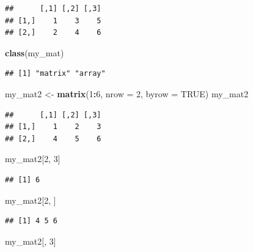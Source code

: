 \documentclass[
]{book}
\newenvironment{Shaded}{\begin{snugshade}}{\end{snugshade}}
\newcommand{\AttributeTok}[1]{\textcolor[rgb]{0.13,0.29,0.53}{#1}}
\newcommand{\ConstantTok}[1]{\textcolor[rgb]{0.56,0.35,0.01}{#1}}
\newcommand{\DecValTok}[1]{\textcolor[rgb]{0.00,0.00,0.81}{#1}}
\newcommand{\FunctionTok}[1]{\textcolor[rgb]{0.13,0.29,0.53}{\textbf{#1}}}
\newcommand{\NormalTok}[1]{#1}
\newcommand{\OtherTok}[1]{\textcolor[rgb]{0.56,0.35,0.01}{#1}}
\newcommand{\SpecialCharTok}[1]{\textcolor[rgb]{0.81,0.36,0.00}{\textbf{#1}}}
\theoremstyle{definition}
\theoremstyle{definition}
\theoremstyle{definition}
\theoremstyle{definition}
\theoremstyle{remark}
\begin{document}
\begin{verbatim}
##      [,1] [,2] [,3]
## [1,]    1    3    5
## [2,]    2    4    6
\end{verbatim}

\begin{Shaded}
\begin{Highlighting}[]
\FunctionTok{class}\NormalTok{(my\_mat)}
\end{Highlighting}
\end{Shaded}

\begin{verbatim}
## [1] "matrix" "array"
\end{verbatim}

\begin{Shaded}
\begin{Highlighting}[]
\NormalTok{my\_mat2 }\OtherTok{\textless{}{-}} \FunctionTok{matrix}\NormalTok{(}\DecValTok{1}\SpecialCharTok{:}\DecValTok{6}\NormalTok{, }\AttributeTok{nrow =} \DecValTok{2}\NormalTok{, }\AttributeTok{byrow =} \ConstantTok{TRUE}\NormalTok{)}
\NormalTok{my\_mat2}
\end{Highlighting}
\end{Shaded}

\begin{verbatim}
##      [,1] [,2] [,3]
## [1,]    1    2    3
## [2,]    4    5    6
\end{verbatim}

\begin{Shaded}
\begin{Highlighting}[]
\NormalTok{my\_mat2[}\DecValTok{2}\NormalTok{, }\DecValTok{3}\NormalTok{]}
\end{Highlighting}
\end{Shaded}

\begin{verbatim}
## [1] 6
\end{verbatim}

\begin{Shaded}
\begin{Highlighting}[]
\NormalTok{my\_mat2[}\DecValTok{2}\NormalTok{, ]}
\end{Highlighting}
\end{Shaded}

\begin{verbatim}
## [1] 4 5 6
\end{verbatim}

\begin{Shaded}
\begin{Highlighting}[]
\NormalTok{my\_mat2[, }\DecValTok{3}\NormalTok{]}
\end{Highlighting}
\end{Shaded}
\end{document}
